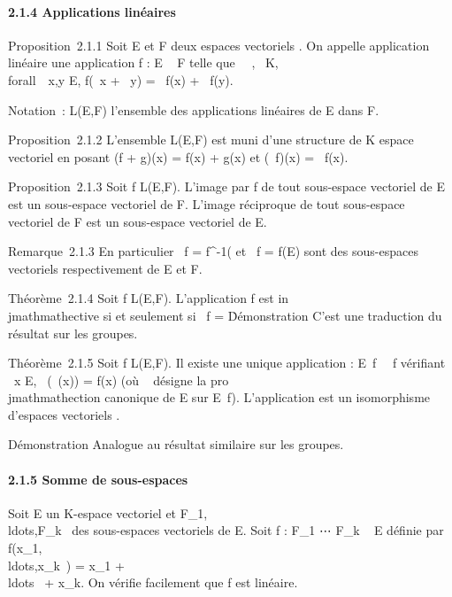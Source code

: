 \paragraph{2.1.4 Applications linéaires}

Proposition~2.1.1 Soit E et F deux espaces vectoriels . On appelle
application linéaire une application f : E \rightarrow~ F telle que
\forall~\alpha~,\beta~ \in K, \\forall~~x,y \in E,
f(\alpha~x + \beta~y) = \alpha~f(x) + \beta~f(y).

Notation~: L(E,F) l'ensemble des applications linéaires de E dans F.

Proposition~2.1.2 L'ensemble L(E,F) est muni d'une structure de K espace
vectoriel en posant (f + g)(x) = f(x) + g(x) et (\lambda~f)(x) = \lambda~f(x).

Proposition~2.1.3 Soit f \in L(E,F). L'image par f de tout sous-espace
vectoriel de E est un sous-espace vectoriel de F. L'image réciproque de
tout sous-espace vectoriel de F est un sous-espace vectoriel de E.

Remarque~2.1.3 En particulier
\mathrmKer~f =
f^-1(\0\) et
\mathrmIm~f = f(E) sont des
sous-espaces vectoriels respectivement de E et F.

Théorème~2.1.4 Soit f \in L(E,F). L'application f est in\\jmathmathective si et
seulement si \mathrmKer~f =
\0\.

Démonstration C'est une traduction du résultat sur les groupes.

Théorème~2.1.5 Soit f \in L(E,F). Il existe une unique application
\overlinef :
E\diagup\mathrmKer~f
\rightarrow~\mathrmIm~f vérifiant
\forall~x \in E, \overlinef~(\pi~(x)) =
f(x) (où \pi~ désigne la pro\\jmathmathection canonique de E sur
E\diagup\mathrmKer~f).
L'application \overlinef est un isomorphisme
d'espaces vectoriels .

Démonstration Analogue au résultat similaire sur les groupes.

\paragraph{2.1.5 Somme de sous-espaces}

Soit E un K-espace vectoriel et
F_1,\\ldots,F_k~
des sous-espaces vectoriels de E. Soit f : F_1
\times⋯ \times F_k \rightarrow~ E définie par
f(x_1,\\ldots,x_k~)
= x_1 +
\\ldots~ +
x_k. On vérifie facilement que f est linéaire.

